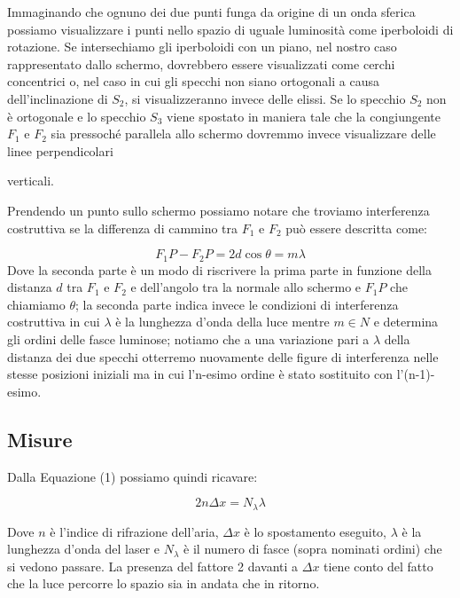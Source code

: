 \documentclass{article}
\begin{document}
Immaginando che ognuno dei due punti funga da origine di un onda sferica possiamo visualizzare i punti nello spazio di uguale luminosità come iperboloidi di rotazione. Se intersechiamo gli iperboloidi con un piano, nel nostro caso rappresentato dallo schermo, dovrebbero essere visualizzati come cerchi concentrici o, nel caso in cui gli specchi non siano ortogonali a causa dell'inclinazione di $S_2$, si visualizzeranno invece delle elissi. 
Se lo specchio $S_2$ non è ortogonale e lo specchio $S_3$ viene spostato in maniera tale che la congiungente $F_1$ e $F_2$ sia pressoché parallela allo schermo dovremmo invece visualizzare delle linee perpendicolari  verticali. 

Prendendo un punto sullo schermo possiamo notare che troviamo interferenza costruttiva se la differenza di cammino tra $F_1$ e $F_2$ può essere descritta come:

\begin{equation} 
F_1P - F_2 P = 2d \cos{\theta} = m \lambda 
\end{equation}
Dove la seconda parte è un modo di riscrivere la prima parte in funzione della distanza $d$ tra $F_1$ e $F_2$ e dell'angolo tra la normale allo schermo e $F_1 P$ che chiamiamo $\theta$; la seconda parte indica invece le condizioni di interferenza costruttiva in cui $\lambda$ è la lunghezza d'onda della luce mentre $m \in N$ %
e determina gli ordini delle fasce luminose; notiamo che a una variazione pari a $\lambda$ della distanza dei due specchi otterremo nuovamente delle figure di interferenza nelle stesse posizioni iniziali ma in cui l'n-esimo ordine è stato sostituito con l'(n-1)-esimo.

\clearpage

\subsection{Misure}
Dalla Equazione (1) possiamo quindi ricavare:

\begin{equation} 
2 n \Delta{x} = N_\lambda \lambda 
\end{equation}

Dove $n$ è l'indice di rifrazione dell'aria, $\Delta{x}$ è lo spostamento eseguito, $\lambda$ è la lunghezza d'onda del laser e $N_\lambda$ è il numero di fasce (sopra nominati ordini) che si vedono passare. La presenza del fattore 2 davanti a $\Delta{x}$ tiene conto del fatto che la luce percorre lo spazio sia in andata che in ritorno.
\end{document}
